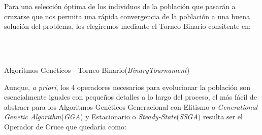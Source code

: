\documentclass[a4paper, 11pt]{article}
\begin{document}
			Para una selección óptima de los individuos de la población que pasarán a cruzarse que nos
			permita una rápida convergencia de la población a una buena solución del problema, los
			elegiremos mediante el Torneo Binario consitente en:
			
			\begin{algorithm}[H]
				\begin{algorithmic}[1]
				\REQUIRE \ \\
						 \
					
				
				\ENDWHILE
				\ELSE
				\ENDIF
				\end{algorithmic}
			\caption{Algoritmos Genéticos - Torneo Binario(\textit{BinaryTournament})}
			\label{GA-BT}
			\end{algorithm}
			
			Aunque, \textit{a priori}, los 4 operadores necesarios para evolucionar la población son
			esencialmente iguales con pequeños detalles a lo largo del proceso, el más fácil de abstraer
			para los Algoritmos Genéticos Generacional con Elitismo o \textit{Generational Genetic
			Algorithm}(\textit{GGA}) y Estacionario o \textit{Steady-State}(\textit{SSGA}) resulta ser
			el Operador de Cruce que quedaría como:
			
\end{document}
